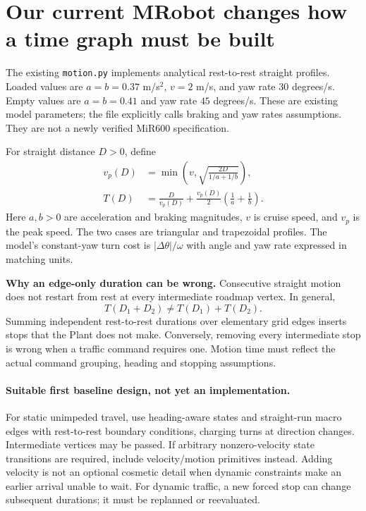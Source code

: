 \documentclass[11pt,a4paper]{article}
\begin{document}
\clearpage
\section{Our current MRobot changes how a time graph must be built}
The existing \texttt{motion.py} implements analytical rest-to-rest straight
profiles. Loaded values are $a=b=0.37$ m/s$^2$, $v=2$ m/s, and yaw rate
$30$ degrees/s. Empty values are $a=b=0.41$ and yaw rate $45$ degrees/s.
These are existing model parameters; the file explicitly calls braking and yaw
rates assumptions. They are not a newly verified MiR600 specification.

For straight distance $D>0$, define
\begin{align}
v_p(D)&=\min\!\left(v,\sqrt{\frac{2D}{1/a+1/b}}\right),\\
T(D)&=\frac{D}{v_p(D)}+\frac{v_p(D)}{2}\left(\frac1a+\frac1b\right).
\end{align}
Here $a,b>0$ are acceleration and braking magnitudes, $v$ is cruise speed,
and $v_p$ is the peak speed. The two cases are triangular and trapezoidal
profiles. The model's constant-yaw turn cost is $|\Delta\theta|/\omega$ with
angle and yaw rate expressed in matching units.

\textbf{Why an edge-only duration can be wrong.} Consecutive straight motion
does not restart from rest at every intermediate roadmap vertex. In general,
\begin{equation}
T(D_1+D_2)\ne T(D_1)+T(D_2).
\end{equation}
Summing independent rest-to-rest durations over elementary grid edges inserts
stops that the Plant does not make. Conversely, removing every intermediate
stop is wrong when a traffic command requires one. Motion time must reflect
the actual command grouping, heading and stopping assumptions.

\begin{center}
\end{center}

\paragraph{Suitable first baseline design, not yet an implementation.}
For static unimpeded travel, use heading-aware states and straight-run macro
edges with rest-to-rest boundary conditions, charging turns at direction
changes. Intermediate vertices may be passed. If arbitrary nonzero-velocity
state transitions are required, include velocity/motion primitives instead.
Adding velocity is not an optional cosmetic detail when dynamic constraints
make an earlier arrival unable to wait. For dynamic traffic, a new forced stop
can change subsequent durations; it must be replanned or reevaluated.
\end{document}
